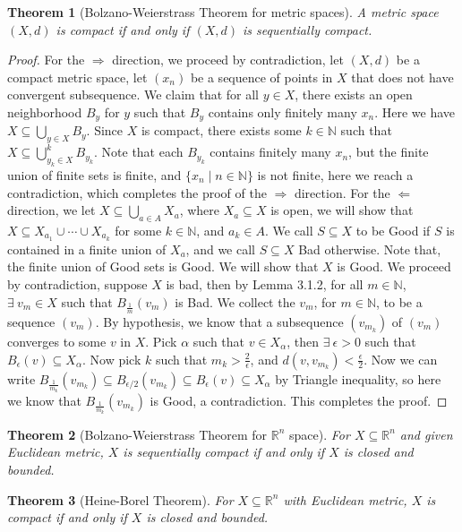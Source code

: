 \documentclass[11pt,oneside]{book}
\theoremstyle{break}
\theoremstyle{break}
\newtheorem{thm}{Theorem}[section]
\newcommand{\R}{\mathbb{R}}
\newcommand{\N}{\mathbb{N}}
\begin{document}
\begin{thm}[Bolzano-Weierstrass Theorem for metric spaces]
A metric space $(X,d)$ is compact if and only if $(X,d)$ is sequentially compact.
\end{thm}
\begin{proof}
For the $\Rightarrow$ direction, we proceed by contradiction, let $(X,d)$ be a compact metric space, let $(x_n)$ be a sequence of points in $X$ that does not have convergent subsequence. We claim that for all $y \in X$, there exists an open neighborhood $B_y$ for $y$ such that $B_y$ contains only finitely many $x_n$. Here we have $X \subseteq \bigcup_{y \in X} B_y$. Since $X$ is compact, there exists some $k \in \N$ such that $X \subseteq \bigcup_{y_k \in X}^k B_{y_k}$. Note that each $B_{y_k}$ contains finitely many $x_n$, but the finite union of finite sets is finite, and $\{x_n \mid n \in \N\} $ is not finite, here we reach a contradiction, which completes the proof of the $\Rightarrow$ direction. For the $\Leftarrow$ direction, we let $X \subseteq \bigcup_{a \in A} X_a$, where $X_a\subseteq X$ is open, we will show that $X \subseteq X_{a_1}\cup\cdots\cup X_{a_k}$ for some $k \in \N$, and $a_k \in A$. We call $S \subseteq X$ to be Good if $S$ is contained in a finite union of $X_a$, and we call $S\subseteq X$ Bad otherwise. Note that, the finite union of Good sets is Good. We will show that $X$ is Good. We proceed by contradiction, suppose $X$ is bad, then by Lemma 3.1.2, for all $m \in \N$, $\exists\ v_m \in X$ such that $B_\frac{1}{m}(v_m)$ is Bad. We collect the $v_m$, for $m \in \N$, to be a sequence $(v_m)$. By hypothesis, we know that a subsequence $(v_{m_k})$ of $(v_m)$ converges to some $v$ in $X$. Pick $\alpha$ such that $v \in X_\alpha$, then $\exists\ \epsilon>0$ such that $B_\epsilon(v) \subseteq X_\alpha$. Now pick $k$ such that $m_k > \frac{2}{\epsilon}$, and $d(v,v_{m_k}) < \frac{\epsilon}{2}$. Now we can write $B_{\frac{1}{m_k}}(v_{m_k}) \subseteq B_{\epsilon/2}(v_{m_k}) \subseteq B_{\epsilon}(v) \subseteq X_\alpha$ by Triangle inequality, so here we know that $B_{\frac{1}{m_k}}(v_{m_k})$ is Good, a contradiction. This completes the proof.
\end{proof}

\begin{thm}[Bolzano-Weierstrass Theorem for $\R^n$ space]
For $X \subseteq \R^n$ and given Euclidean metric, $X$ is sequentially compact if and only if $X$ is closed and bounded.
\end{thm}
\begin{thm}[Heine-Borel Theorem]
For $X \subseteq \R^n$ with Euclidean metric, $X$ is compact if and only if $X$ is closed and bounded. 
\end{thm}
\end{document}
